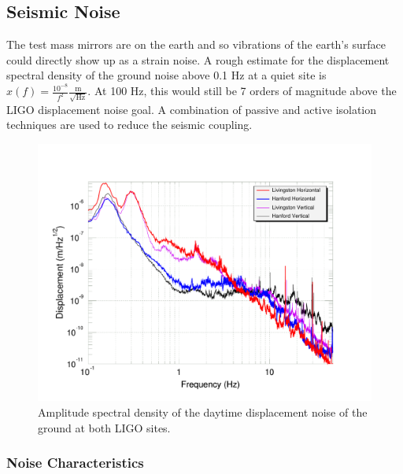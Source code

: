 \subsection{Seismic Noise}
The test mass mirrors are on the earth and so vibrations of the earth's
surface could directly show up as a strain noise. A rough estimate for 
the displacement spectral density of the ground noise above 0.1 Hz at a quiet site is 
$x(f) = \frac{10^{-8}}{f^{2}} \frac{\mbox{m}}{\sqrt{\mbox{Hz}}}$. 
At 100 Hz, this would still be 7 orders of magnitude above the 
LIGO displacement noise goal. A combination of passive and active 
isolation techniques are used to reduce the seismic coupling.

\begin{figure}[!h]
\centerline{\includegraphics[angle=0,width=6.5in]{Figures/Chap4/LLOLHO-seis2.pdf}}
\caption[Seismic Spectra]{Amplitude spectral density of the daytime displacement 
                          noise of the ground at both LIGO sites.}
\label{fig:SeismicNoise}
\end{figure}

\subsubsection{Noise Characteristics}
\label{sec:SeismicCharacter}

